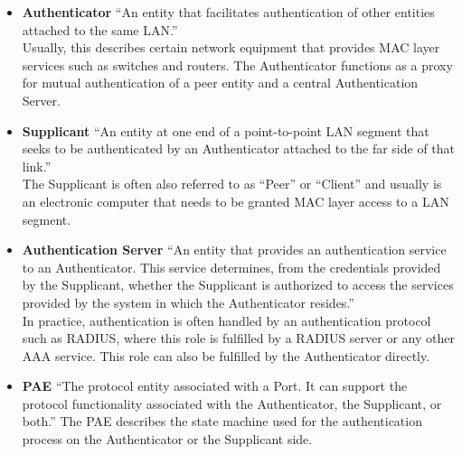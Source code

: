 \begin{itemize}
    \item \textbf{Authenticator} ``An entity that facilitates authentication of other entities attached to the same LAN.''\\
    Usually, this describes certain network equipment that provides MAC layer services such as switches and routers. The Authenticator functions as a proxy for mutual authentication of a peer entity and a central Authentication Server.
    \item \textbf{Supplicant} ``An entity at one end of a point-to-point LAN segment that seeks to be authenticated by an Authenticator attached to the far side of that link.''\\
    The Supplicant is often also referred to as ``Peer'' or ``Client'' and usually is an electronic computer that needs to be granted MAC layer access to a LAN segment.
    \item \textbf{Authentication Server} ``An entity that provides an authentication service to an Authenticator. This service determines, from the credentials provided by the Supplicant, whether the Supplicant is authorized to access the services provided by the system in which the Authenticator resides.''\\
    In practice, authentication is often handled by an authentication protocol such as RADIUS, where this role is fulfilled by a RADIUS server or any other \acs{AAA} service. This role can also be fulfilled by the Authenticator directly.
    \item \textbf{\ac{PAE}} ``The protocol entity associated with a Port. It can support the protocol functionality associated with the Authenticator, the Supplicant, or both.''
    The \ac{PAE} describes the state machine used for the authentication process on the Authenticator or the Supplicant side. %

\end{itemize}
